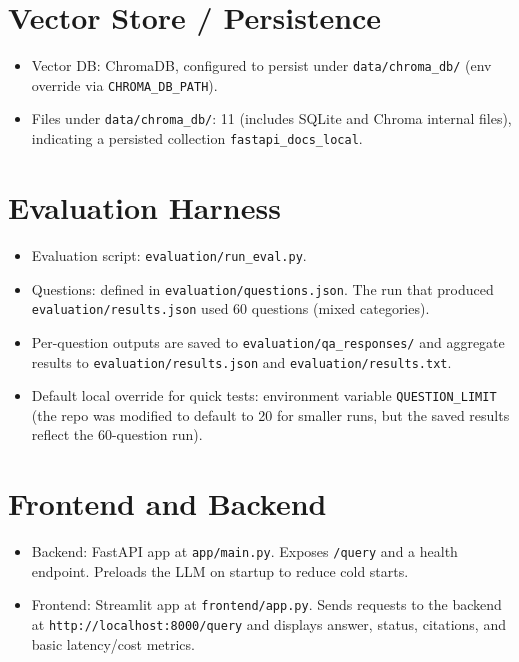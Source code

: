 \documentclass[11pt]{article}
\begin{document}
\section{Vector Store / Persistence}
\begin{itemize}
  \item Vector DB: ChromaDB, configured to persist under \texttt{data/chroma_db/} (env override via \texttt{CHROMA\_DB\_PATH}).
  \item Files under \texttt{data/chroma_db/}: 11 (includes SQLite and Chroma internal files), indicating a persisted collection \texttt{fastapi\_docs\_local}.
\end{itemize}

\section{Evaluation Harness}
\begin{itemize}
  \item Evaluation script: \texttt{evaluation/run\_eval.py}.
  \item Questions: defined in \texttt{evaluation/questions.json}. The run that produced \texttt{evaluation/results.json} used 60 questions (mixed categories).
  \item Per-question outputs are saved to \texttt{evaluation/qa\_responses/} and aggregate results to \texttt{evaluation/results.json} and \texttt{evaluation/results.txt}.
  \item Default local override for quick tests: environment variable \texttt{QUESTION\_LIMIT} (the repo was modified to default to 20 for smaller runs, but the saved results reflect the 60-question run).
\end{itemize}

\section{Frontend and Backend}
\begin{itemize}
  \item Backend: FastAPI app at \texttt{app/main.py}. Exposes \texttt{/query} and a health endpoint. Preloads the LLM on startup to reduce cold starts.
  \item Frontend: Streamlit app at \texttt{frontend/app.py}. Sends requests to the backend at \texttt{http://localhost:8000/query} and displays answer, status, citations, and basic latency/cost metrics.
\end{itemize}
\end{document}
